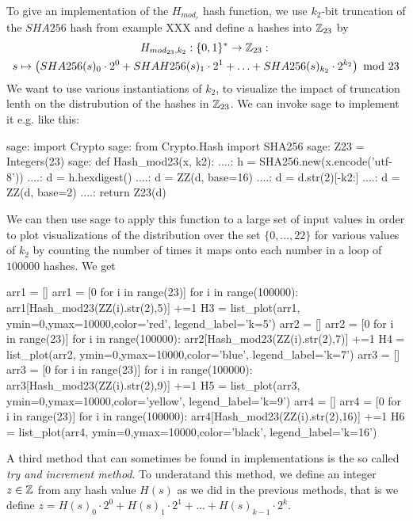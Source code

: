 \begin{example} To give an implementation of the $H_{mod_r}$ hash function, we use  $k_2$-bit truncation of the $SHA256$ hash from example XXX and define a hashes into $\mathbb{Z}_{23}$ by
\begin{multline*}
H_{mod_{23},k_2}: \{0,1\}^* \to \mathbb{Z}_{23}:\; \\
s\mapsto
\left(SHA256(s)_0\cdot 2^0 + SHAH256(s)_1\cdot 2^1 + \ldots + SHA256(s)_{k_2}\cdot 2^{k_2}\right) \text{ mod } 23 
\end{multline*}
We want to use various instantiations of $k_2$, to visualize the impact of truncation lenth on the distrubution of the hashes in $\mathbb{Z}_{23}$. We can invoke sage to implement it e.g. like this:
\begin{sagecommandline}
sage: import Crypto 
sage: from Crypto.Hash import SHA256
sage: Z23 = Integers(23)
sage: def Hash_mod23(x, k2):
....:     h = SHA256.new(x.encode('utf-8'))
....:     d = h.hexdigest()
....:     d = ZZ(d, base=16)
....:     d = d.str(2)[-k2:]
....:     d = ZZ(d, base=2)
....:     return Z23(d)
\end{sagecommandline}
We can then use sage to apply this function to a large set of input values in order to plot visualizations of the distribution over the set $\{0,\ldots,22\}$ for various values of $k_2$ by counting the number of times it maps onto each number in a loop of $100000$ hashes. We get
\begin{sagesilent}
arr1 = []
arr1 = [0 for i in range(23)]
for i in range(100000):
    arr1[Hash_mod23(ZZ(i).str(2),5)] +=1
H3 = list_plot(arr1, ymin=0,ymax=10000,color='red', legend_label='k=5')
arr2 = []
arr2 = [0 for i in range(23)]
for i in range(100000):
    arr2[Hash_mod23(ZZ(i).str(2),7)] +=1
H4 = list_plot(arr2, ymin=0,ymax=10000,color='blue', legend_label='k=7')
arr3 = []
arr3 = [0 for i in range(23)]
for i in range(100000):
    arr3[Hash_mod23(ZZ(i).str(2),9)] +=1
H5 = list_plot(arr3, ymin=0,ymax=10000,color='yellow', legend_label='k=9')
arr4 = []
arr4 = [0 for i in range(23)]
for i in range(100000):
    arr4[Hash_mod23(ZZ(i).str(2),16)] +=1
H6 = list_plot(arr4, ymin=0,ymax=10000,color='black', legend_label='k=16')
\end{sagesilent}
\begin{center} 
\end{center}
\end{example}
A third method that can sometimes be found in implementations is the so called \textit{try and increment method}. To underatand this method, we define an integer $z\in\mathbb{Z}$ from any hash value $H(s)$ as we did in the previous methods, that is we define $z = H(s)_0\cdot 2^0 + H(s)_1\cdot 2^1 + \ldots + H(s)_{k-1}\cdot 2^{k}$. 

